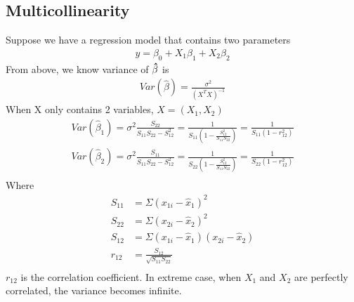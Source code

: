 \documentclass[a4paper]{article}
\begin{document}
\subsection{Multicollinearity}
Suppose we have a regression model that contains two parameters
\begin{align*}
y = \beta_0 + X_1\beta_1 + X_2 \beta_2
\end{align*}
From above, we know variance of ${\bf \hat \beta}$ is
\begin{align*}
Var(\hat \beta) = \frac{\sigma^2}{(X^TX)^{-1}}
\end{align*}
When X only contains 2 variables, $X=(X_1, X_2)$
\begin{align*}
Var(\hat \beta_1) = \sigma^2 \frac{S_{22}}{S_{11}S_{22}-S_{12}^2} = \frac{1}{S_{11}(1-\frac{S^2_{12}}{S_{11}S_{22}})}= \frac{1}{S_{11}(1-r_{12}^2)} \\
Var(\hat \beta_2) = \sigma^2 \frac{S_{11}}{S_{11}S_{22}-S_{12}^2} = \frac{1}{S_{22}(1-\frac{S^2_{12}}{S_{11}S_{22}})}= \frac{1}{S_{22}(1-r_{12}^2)} \\
\end{align*}
Where
\begin{align*}
S_{11} & =\Sigma(x_{1i}-\hat x_1)^2\\
S_{22} & =\Sigma(x_{2i}-\hat x_2)^2\\
S_{12} & =\Sigma(x_{1i}-\hat x_1)(x_{2i}-\hat x_2)\\
r_{12} & = \frac{S_{12}}{\sqrt{S_{11}S_{22}}}\\
\end{align*}
$r_{12}$ is the correlation coefficient. In extreme case, when $X_1$ and $X_2$ are perfectly correlated, the variance becomes infinite.\\
\end{document}
